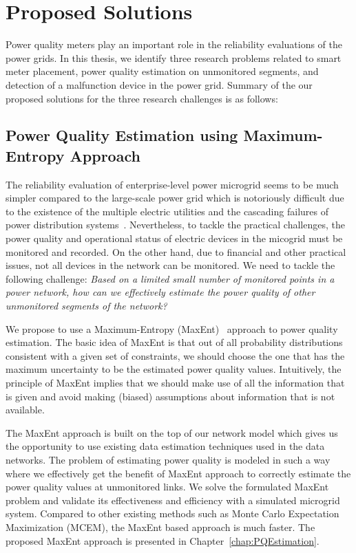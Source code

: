 \section{Proposed Solutions}
Power quality meters play an important role in the reliability evaluations of the power grids. In this thesis, we identify three research problems related to smart meter placement, power quality estimation on unmonitored segments, and detection of a malfunction device in the power grid. Summary of the our proposed solutions for the three research challenges is as follows:

\subsection{Power Quality Estimation using Maximum-Entropy Approach}
The reliability evaluation of enterprise-level power microgrid seems to be much simpler compared to the large-scale power grid which is notoriously difficult due to the existence of the multiple electric utilities and the cascading failures of power distribution systems~\cite{Albert04}. Nevertheless, to tackle the practical challenges, the power quality and operational status of electric devices in the micogrid must be monitored and recorded. On the other hand, due to financial and other practical issues, not all devices in the network can be monitored. We need to tackle the following challenge: \textit{Based on a limited small number of monitored points in a power network, how can we effectively estimate the power quality of other unmonitored segments of the network?}

We propose to use a Maximum-Entropy (MaxEnt)~\cite{maxent} approach to power quality estimation. The basic idea of MaxEnt is that out of all probability distributions consistent with a given set of constraints, we should choose the one that has the maximum uncertainty to be the estimated power quality values. Intuitively, the principle of MaxEnt implies that we should make use of all the information that is given and avoid making (biased) assumptions about information that is not available.

The MaxEnt approach is built on the top of our network model which gives us the opportunity to use existing data estimation techniques used in the data networks. The problem of estimating power quality is modeled in such a way where we effectively get the benefit of MaxEnt approach to correctly estimate the power quality values at unmonitored links. We solve the formulated MaxEnt problem and validate its effectiveness and efficiency with a simulated microgrid system. Compared to other existing methods such as Monte Carlo Expectation Maximization (MCEM), the MaxEnt based approach is much faster. The proposed MaxEnt approach is presented in Chapter~\ref{chap:PQEstimation}.

